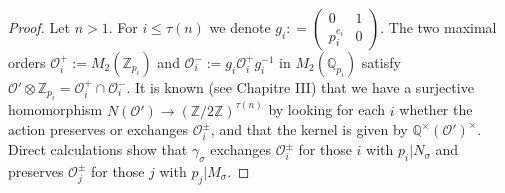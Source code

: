 \documentclass{article}
\theoremstyle{plain}
\theoremstyle{definition}
\theoremstyle{remark}
\newcommand{\Z}{{\mathbb Z}}
\newcommand{\Q}{{\mathbb Q}}
\begin{document}
\begin{proof}
Let $n>1$. 
For $i \leq \tau (n)$ we denote 
$g_{i} : = \left( \begin{smallmatrix}
                                                                                  0                 &     1 \\
                                                                              p_{i}^{e_{i}}   &      0  
                                  \end{smallmatrix} \right) $. 
The two maximal orders 
$\mathcal{O}^{+}_{i} := M_{2}({\Z}_{p_{i}})$  
and 
$\mathcal{O}^{-}_{i} := g_{i} \mathcal{O}^{+}_{i}g_{i}^{-1}$ 
in $M_{2}({\Q}_{p_{i}})$ 
satisfy 
$\mathcal{O}'\otimes {\Z}_{p_{i}} = \mathcal{O}^{+}_{i} \cap \mathcal{O}^{-}_{i}$.   
It is known (see \cite{Vi} Chapitre III) that 
we have a surjective homomorphism 
$N(\mathcal{O}') \to ({\Z}/2{\Z})^{\tau (n)}$  
by looking for each $i$ whether the action preserves or exchanges $\mathcal{O}_{i}^{\pm }$,     
and that the kernel is given by ${\Q}^{\times}(\mathcal{O}')^{\times}$.  
Direct calculations show that 
$\gamma _{\sigma}$  
exchanges $\mathcal{O}_{i}^{\pm }$  for those $i$ with $p_{i}|N_{\sigma}$ 
and preserves $\mathcal{O}_{j}^{\pm }$ for those $j$ with $p_{j}|M_{\sigma}$. 
\end{proof}
\end{document}
